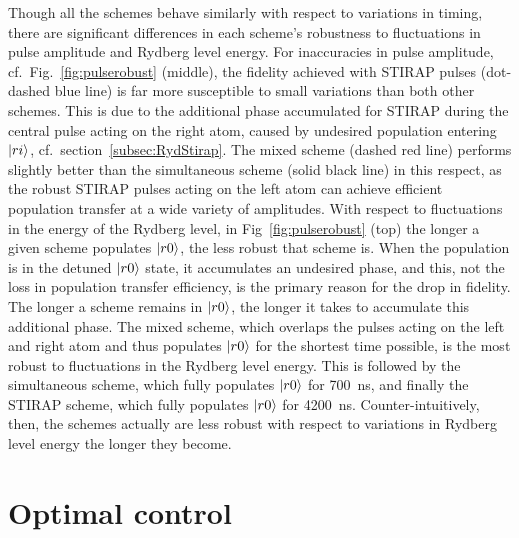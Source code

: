 Though all the schemes behave similarly with respect to variations in timing, there are
significant differences in each scheme's robustness to fluctuations in
pulse amplitude and Rydberg level energy. For inaccuracies in pulse
amplitude, cf.\ Fig.~\ref{fig:pulserobust}
(middle), the fidelity achieved with STIRAP pulses (dot-dashed blue
line) is far more
susceptible to small variations than both other schemes. This is due to the
additional phase accumulated for STIRAP during the central  pulse
acting on the right atom, caused by undesired population entering
$\Ket{ri}$, cf.\ section~\ref{subsec:RydStirap}. The mixed scheme (dashed red
line) performs slightly better than the simultaneous scheme (solid black line)
in this respect, as the robust STIRAP pulses acting on the left atom
can achieve efficient  population transfer at a wide variety of amplitudes.
With respect to fluctuations in the energy of the Rydberg level,
in Fig~\ref{fig:pulserobust} (top) the longer a given scheme populates
$\Ket{r0}$, the less robust that scheme is. When the population is in the
detuned $\Ket{r0}$ state, it accumulates  an undesired phase, and this,
not the loss in population transfer efficiency, is the primary reason for the
drop in fidelity. The longer a scheme remains in  $\Ket{r0}$, the longer it
takes to accumulate this additional phase. The mixed scheme, which overlaps
the pulses acting on the left and right atom and thus populates
$\Ket{r0}$ for the shortest time possible, is the most robust to
fluctuations in the Rydberg level energy. This is followed by the
simultaneous scheme, which fully  populates $\Ket{r0}$ for 700~ns, and
finally the STIRAP scheme, which fully populates $\Ket{r0}$ for 4200~ns.
Counter-intuitively, then, the schemes actually are less robust with
respect to variations in Rydberg level energy the longer they become.

\section{Optimal control}
\label{sec:RydOCT}

